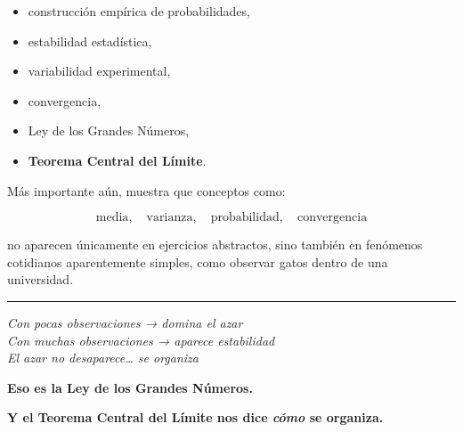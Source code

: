 \begin{itemize}
\item construcción empírica de probabilidades,
\item estabilidad estadística,
\item variabilidad experimental,
\item convergencia,
\item Ley de los Grandes Números,
\item \textbf{Teorema Central del Límite}.
\end{itemize}

Más importante aún, muestra que conceptos como:

\[
\text{media},
\quad
\text{varianza},
\quad
\text{probabilidad},
\quad
\text{convergencia}
\]

no aparecen únicamente en ejercicios abstractos, sino también en fenómenos cotidianos aparentemente simples, como observar gatos dentro de una universidad.

\vspace{0.5cm}
\hrule
\vspace{0.2cm}
\begin{center}
\large
\textit{Con pocas observaciones → domina el azar} \\
\textit{Con muchas observaciones → aparece estabilidad} \\
\textit{El azar no desaparece… se organiza}
\end{center}

\begin{center}
\textbf{Eso es la Ley de los Grandes Números.}
\end{center}

\begin{center}
\textbf{Y el Teorema Central del Límite nos dice \textit{cómo} se organiza.}
\end{center}
